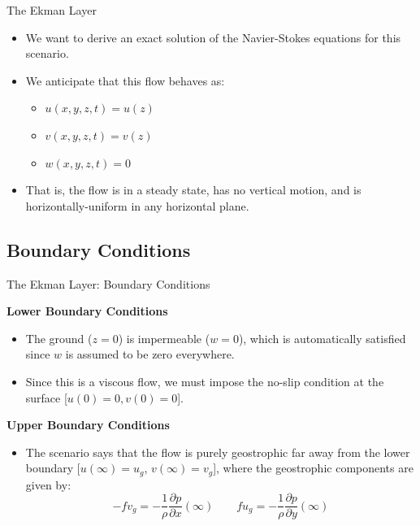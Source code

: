 \begin{frame}{The Ekman Layer}

\begin{itemize}
	\item We want to derive an exact solution of the Navier-Stokes equations for this scenario.
	\item We anticipate that this flow behaves as:
	\begin{itemize}
		\item $u(x,y,z,t) = u(z)$
		\item $v(x,y,z,t) = v(z)$
		\item $w(x,y,z,t) = 0$
	\end{itemize}
	\item That is, the flow is in a steady state, has no vertical motion, and is horizontally-uniform in any horizontal plane.
\end{itemize}
\end{frame}


\subsection{Boundary Conditions}

\begin{frame}{The Ekman Layer: Boundary Conditions}

\textbf{Lower Boundary Conditions}
\begin{itemize}
	\item The ground ($z=0$) is impermeable ($w=0$), which is automatically satisfied since $w$ is assumed to be zero everywhere.
	\item Since this is a viscous flow, we must impose the no-slip condition at the surface [$u(0) = 0, v(0)=0$].
\end{itemize}

\textbf{Upper Boundary Conditions}
\begin{itemize}
	\item The scenario says that the flow is purely geostrophic far away from the lower boundary [$u(\infty)=u_g$, $v(\infty)=v_g$], where the geostrophic components are given by:
	$$-fv_g = -\frac{1}{\rho} \frac{\partial p}{\partial x}(\infty) \qquad fu_g = -\frac{1}{\rho} \frac{\partial p}{\partial y}(\infty)$$
\end{itemize}
\end{frame}

